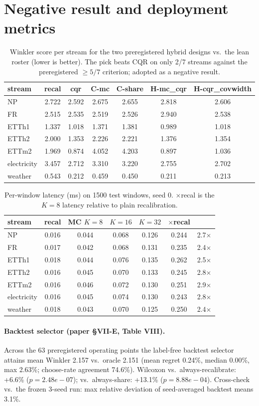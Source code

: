 \documentclass[10pt]{article}
\begin{document}
\section{Negative result and deployment metrics}
\begin{table}[h]\centering\small
\caption{Winkler score per stream for the two preregistered hybrid designs vs.\ the lean roster (lower is better).  The pick beats CQR on only 2/7 streams against the preregistered $\ge 5/7$ criterion; adopted as a negative result.}
\begin{tabular}{lcccccc}
\toprule
stream & recal & cqr & C-mc & C-share & H-mc\_cqr & H-cqr\_covwidth \\
\midrule
NP & 2.722 & 2.592 & 2.675 & 2.655 & 2.818 & 2.606 \\
FR & 2.515 & 2.535 & 2.519 & 2.526 & 2.940 & 2.538 \\
ETTh1 & 1.337 & 1.018 & 1.371 & 1.381 & 0.989 & 1.018 \\
ETTh2 & 2.000 & 1.353 & 2.226 & 2.221 & 1.376 & 1.354 \\
ETTm2 & 1.969 & 0.874 & 4.052 & 4.203 & 0.897 & 1.036 \\
electricity & 3.457 & 2.712 & 3.310 & 3.220 & 2.755 & 2.702 \\
weather & 0.543 & 0.212 & 0.459 & 0.450 & 0.211 & 0.213 \\
\bottomrule
\end{tabular}
\end{table}
\begin{table}[h]\centering\small
\caption{Per-window latency (ms) on 1500 test windows, seed 0. $\times$recal is the $K{=}8$ latency relative to plain recalibration.}
\begin{tabular}{lccccc}
\toprule
stream & recal & MC $K{=}8$ & $K{=}16$ & $K{=}32$ & $\times$recal \\
\midrule
NP & 0.016 & 0.044 & 0.068 & 0.126 & 0.244 & 2.7$\times$ \\
FR & 0.017 & 0.042 & 0.068 & 0.131 & 0.235 & 2.4$\times$ \\
ETTh1 & 0.018 & 0.044 & 0.076 & 0.135 & 0.262 & 2.5$\times$ \\
ETTh2 & 0.016 & 0.045 & 0.070 & 0.133 & 0.245 & 2.8$\times$ \\
ETTm2 & 0.016 & 0.046 & 0.072 & 0.130 & 0.251 & 2.9$\times$ \\
electricity & 0.016 & 0.045 & 0.074 & 0.130 & 0.243 & 2.8$\times$ \\
weather & 0.018 & 0.043 & 0.070 & 0.125 & 0.250 & 2.4$\times$ \\
\bottomrule
\end{tabular}
\end{table}
\paragraph{Backtest selector (paper \S VII-E, Table VIII).} Across the 63 preregistered operating points the label-free backtest selector attains mean Winkler 2.157 vs.\ oracle 2.151 (mean regret 0.24\%, median 0.00\%, max 2.63\%; choose-rate agreement 74.6\%).  Wilcoxon vs.\ always-recalibrate: +6.6\% ($p=2.48e-07$); vs.\ always-share: +13.1\% ($p=8.88e-04$).  Cross-check vs.\ the frozen 3-seed run: max relative deviation of seed-averaged backtest means 3.1\%.
\end{document}
